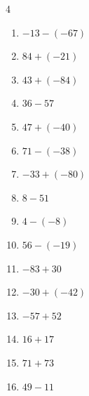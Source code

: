 \begin{multicols}{4}
\begin{enumerate}
  \item $-13-(-67)$

        \phantom{$=54$}

  \item $84+(-21)$

        \phantom{$=63$}

  \item $43+(-84)$

        \phantom{$=-41$}

  \item $36-57$

        \phantom{$=-21$}

  \item $47+(-40)$

        \phantom{$=7$}

  \item $71-(-38)$

        \phantom{$=109$}

  \item $-33+(-80)$

        \phantom{$=-113$}

  \item $8-51$

        \phantom{$=-43$}

  \item $4-(-8)$

        \phantom{$=12$}

  \item $56-(-19)$

        \phantom{$=75$}

  \item $-83+30$

        \phantom{$=-53$}

  \item $-30+(-42)$

        \phantom{$=-72$}

  \item $-57+52$

        \phantom{$=-5$}

  \item $16+17$

        \phantom{$=33$}

  \item $71+73$

        \phantom{$=144$}

  \item $49-11$

        \phantom{$=38$}


\end{enumerate}
\end{multicols}
